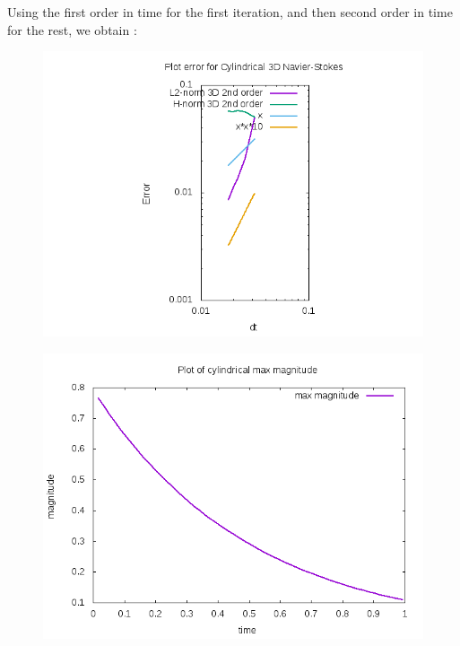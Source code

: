 \documentclass{beamer}
\begin{document}
\begin{frame}
Using the first order in time for the first iteration, and then second order in time for the rest, we obtain :
\begin{figure}
	\centering
	\includegraphics[width=0.8\linewidth]{NS_3D/error_cyl}
	\caption{}
	\label{fig:errorcyl}
\end{figure}
\end{frame}

\begin{frame}
\begin{figure}
	\centering
	\includegraphics[width=0.9\linewidth]{NS_3D/magnitude_cyl}
	\caption{}
	\label{fig:magnitudecyl}
\end{figure}
\end{frame}
\end{document}
